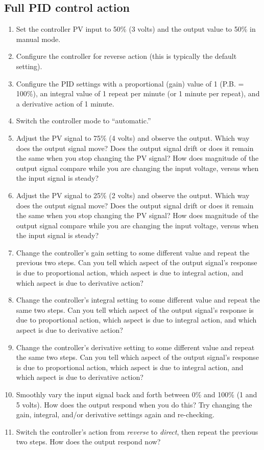 \filbreak
\subsection{Full PID control action}

\begin{enumerate}
\item Set the controller PV input to 50\% (3 volts) and the output value to 50\% in manual mode.
\item Configure the controller for reverse action (this is typically the default setting).
\item Configure the PID settings with a proportional (gain) value of 1 (P.B. = 100\%), an integral value of 1 repeat per minute (or 1 minute per repeat), and a derivative action of 1 minute.
\item Switch the controller mode to ``automatic.''
\item Adjust the PV signal to 75\% (4 volts) and observe the output.  Which way does the output signal move?  Does the output signal drift or does it remain the same when you stop changing the PV signal?  How does magnitude of the output signal compare while you are changing the input voltage, versus when the input signal is steady?
\item Adjust the PV signal to 25\% (2 volts) and observe the output.  Which way does the output signal move?  Does the output signal drift or does it remain the same when you stop changing the PV signal?  How does magnitude of the output signal compare while you are changing the input voltage, versus when the input signal is steady?
\item Change the controller's gain setting to some different value and repeat the previous two steps.  Can you tell which aspect of the output signal's response is due to proportional action, which aspect is due to integral action, and which aspect is due to derivative action?
\item Change the controller's integral setting to some different value and repeat the same two steps.  Can you tell which aspect of the output signal's response is due to proportional action, which aspect is due to integral action, and which aspect is due to derivative action?
\item Change the controller's derivative setting to some different value and repeat the same two steps.  Can you tell which aspect of the output signal's response is due to proportional action, which aspect is due to integral action, and which aspect is due to derivative action?
\item Smoothly vary the input signal back and forth between 0\% and 100\% (1 and 5 volts).  How does the output respond when you do this?  Try changing the gain, integral, and/or derivative settings again and re-checking.
\item Switch the controller's action from \textit{reverse} to \textit{direct}, then repeat the previous two steps.  How does the output respond now?
\end{enumerate}








